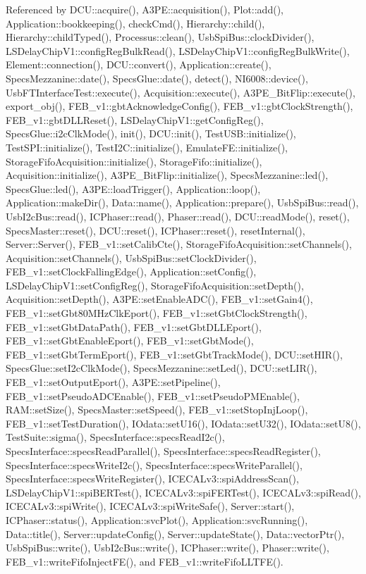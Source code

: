 Referenced by DCU::acquire(), A3PE::acquisition(), Plot::add(), Application::bookkeeping(), checkCmd(), Hierarchy::child(), Hierarchy::childTyped(), Processus::clean(), UsbSpiBus::clockDivider(), LSDelayChipV1::configRegBulkRead(), LSDelayChipV1::configRegBulkWrite(), Element::connection(), DCU::convert(), Application::create(), SpecsMezzanine::date(), SpecsGlue::date(), detect(), NI6008::device(), UsbFTInterfaceTest::execute(), Acquisition::execute(), A3PE\_\-BitFlip::execute(), export\_\-obj(), FEB\_\-v1::gbtAcknowledgeConfig(), FEB\_\-v1::gbtClockStrength(), FEB\_\-v1::gbtDLLReset(), LSDelayChipV1::getConfigReg(), SpecsGlue::i2cClkMode(), init(), DCU::init(), TestUSB::initialize(), TestSPI::initialize(), TestI2C::initialize(), EmulateFE::initialize(), StorageFifoAcquisition::initialize(), StorageFifo::initialize(), Acquisition::initialize(), A3PE\_\-BitFlip::initialize(), SpecsMezzanine::led(), SpecsGlue::led(), A3PE::loadTrigger(), Application::loop(), Application::makeDir(), Data::name(), Application::prepare(), UsbSpiBus::read(), UsbI2cBus::read(), ICPhaser::read(), Phaser::read(), DCU::readMode(), reset(), SpecsMaster::reset(), DCU::reset(), ICPhaser::reset(), resetInternal(), Server::Server(), FEB\_\-v1::setCalibCte(), StorageFifoAcquisition::setChannels(), Acquisition::setChannels(), UsbSpiBus::setClockDivider(), FEB\_\-v1::setClockFallingEdge(), Application::setConfig(), LSDelayChipV1::setConfigReg(), StorageFifoAcquisition::setDepth(), Acquisition::setDepth(), A3PE::setEnableADC(), FEB\_\-v1::setGain4(), FEB\_\-v1::setGbt80MHzClkEport(), FEB\_\-v1::setGbtClockStrength(), FEB\_\-v1::setGbtDataPath(), FEB\_\-v1::setGbtDLLEport(), FEB\_\-v1::setGbtEnableEport(), FEB\_\-v1::setGbtMode(), FEB\_\-v1::setGbtTermEport(), FEB\_\-v1::setGbtTrackMode(), DCU::setHIR(), SpecsGlue::setI2cClkMode(), SpecsMezzanine::setLed(), DCU::setLIR(), FEB\_\-v1::setOutputEport(), A3PE::setPipeline(), FEB\_\-v1::setPseudoADCEnable(), FEB\_\-v1::setPseudoPMEnable(), RAM::setSize(), SpecsMaster::setSpeed(), FEB\_\-v1::setStopInjLoop(), FEB\_\-v1::setTestDuration(), IOdata::setU16(), IOdata::setU32(), IOdata::setU8(), TestSuite::sigma(), SpecsInterface::specsReadI2c(), SpecsInterface::specsReadParallel(), SpecsInterface::specsReadRegister(), SpecsInterface::specsWriteI2c(), SpecsInterface::specsWriteParallel(), SpecsInterface::specsWriteRegister(), ICECALv3::spiAddressScan(), LSDelayChipV1::spiBERTest(), ICECALv3::spiFERTest(), ICECALv3::spiRead(), ICECALv3::spiWrite(), ICECALv3::spiWriteSafe(), Server::start(), ICPhaser::status(), Application::svcPlot(), Application::svcRunning(), Data::title(), Server::updateConfig(), Server::updateState(), Data::vectorPtr(), UsbSpiBus::write(), UsbI2cBus::write(), ICPhaser::write(), Phaser::write(), FEB\_\-v1::writeFifoInjectFE(), and FEB\_\-v1::writeFifoLLTFE().


